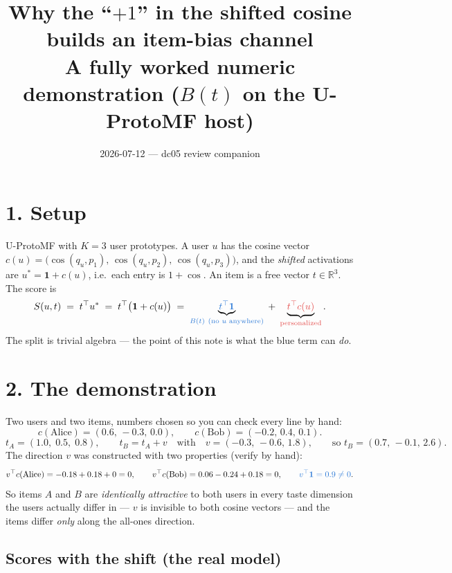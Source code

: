 \documentclass[11pt,a4paper]{article}
\title{Why the ``$+1$'' in the shifted cosine builds an item-bias channel\\
\large A fully worked numeric demonstration ($B(t)$ on the U-ProtoMF host)}
\date{2026-07-12 --- dc05 review companion}
\author{}
\begin{document}
\maketitle
\vspace{-2.5em}

\section*{1. Setup}

U-ProtoMF with $K=3$ user prototypes. A user $u$ has the cosine vector
$c(u) = \big(\cos(q_u,p_1),\,\cos(q_u,p_2),\,\cos(q_u,p_3)\big)$, and the
\emph{shifted} activations are $u^{*} = \mathbf{1} + c(u)$, i.e.\ each entry is
$1+\cos$. An item is a free vector $t\in\mathbb{R}^{3}$. The score is
\[
S(u,t) \;=\; t^{\top}u^{*}
\;=\; t^{\top}\big(\mathbf{1} + c(u)\big)
\;=\; \underbrace{\textcolor{base}{t^{\top}\mathbf{1}}}_{\textcolor{base}{B(t)\ \text{(no $u$ anywhere)}}}
\;+\; \underbrace{\textcolor{pers}{t^{\top}c(u)}}_{\textcolor{pers}{\text{personalized}}}.
\]
The split is trivial algebra --- the point of this note is what the
\textcolor{base}{blue term} can \emph{do}.

\section*{2. The demonstration}

Two users and two items, numbers chosen so you can check every line by hand:
\[
c(\text{Alice}) = (0.6,\,-0.3,\,0.0), \qquad
c(\text{Bob}) = (-0.2,\,0.4,\,0.1).
\]
\[
t_A = (1.0,\;0.5,\;0.8), \qquad
t_B = t_A + v \quad\text{with}\quad v = (-0.3,\,-0.6,\,1.8),
\qquad\text{so } t_B = (0.7,\,-0.1,\,2.6).
\]
The direction $v$ was constructed with two properties (verify by hand):
\[
v^{\top}c(\text{Alice}) = -0.18+0.18+0 = 0,
\qquad
v^{\top}c(\text{Bob}) = 0.06-0.24+0.18 = 0,
\qquad
\textcolor{base}{v^{\top}\mathbf{1} = 0.9 \neq 0}.
\]
So items $A$ and $B$ are \emph{identically attractive} to both users in every
taste dimension the users actually differ in --- $v$ is invisible to both
cosine vectors --- and the items differ \emph{only} along the all-ones
direction.

\subsection*{Scores with the shift (the real model)}
\end{document}
